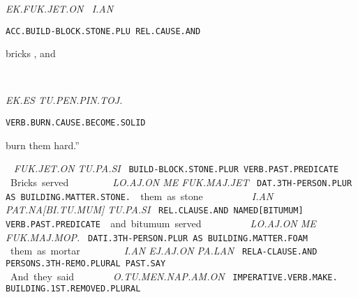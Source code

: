 {{\it EK.FUK.JET.ON~			I.AN }

{\tt ACC.BUILD-BLOCK.STONE.PLU 	REL.CAUSE.AND		 }

bricks			, and 	 

\drie
  

\ek\es~\tu\pen\pin\toj\period

{\it EK.ES TU.PEN.PIN.TOJ.}

{\tt VERB.BURN.CAUSE.BECOME.SOLID}

burn them			hard.” 
\drie


\fuk\jet\on ~ \tu\pa\si

{\it FUK.JET.ON			TU.PA.SI			 }

{\tt BUILD-BLOCK.STONE.PLUR          VERB.PAST.PREDICATE	 }

Bricks 				served 				 
\drie

\lo\aj\on ~ \me ~\fuk\maj\jet

{\it LO.AJ.ON		ME	FUK.MAJ.JET }

{\tt DAT.3TH-PERSON.PLUR AS	BUILDING.MATTER.STONE. }

them			as 	stone	 


\drie
  

\Atlani\an ~ \pat\na\cartouche{\Atlanpi\tu\mum} ~ \tu\pa\si

{\it I.AN	PAT.NA[BI.TU.MUM]	TU.PA.SI }

{\tt REL.CLAUSE.AND	NAMED[BITUMUM]	VERB.PAST.PREDICATE }

and	bitumum 		served  
\drie


  

\lo\aj\on ~\me ~\fuk\maj\mop\period

{\it LO.AJ.ON			ME	FUK.MAJ.MOP. }

{\tt DATI.3TH-PERSON.PLUR               AS	BUILDING.MATTER.FOAM }

them				as 	mortar. 

\drie
  

\Atlani\an ~ \ej\aj\on ~ \pa\lan

{\it I.AN			EJ.AJ.ON			PA.LAN }

{\tt RELA-CLAUSE.AND          PERSONS.3TH-REMO.PLURAL 	PAST.SAY }

And 			they 				said  

\drie

  

\Atlano\tu\men\nap\am\on

{\it O.TU.MEN.NAP.AM.ON }

{\tt IMPERATIVE.VERB.MAKE. BUILDING.1ST.REMOVED.PLURAL	 }

}
